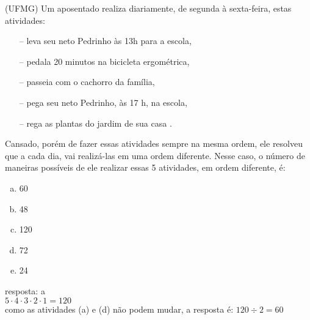 \begin{ex}
 (UFMG) Um aposentado realiza diariamente, de segunda à sexta-feira, estas atividades:
    \begin{itemize}
    \item [--] leva seu neto Pedrinho às 13h para a escola,
    \item [--] pedala 20 minutos na bicicleta ergométrica, 
    \item [--] passeia com o cachorro da família,
    \item [--] pega seu neto Pedrinho, às 17 h, na escola,
    \item[--] rega as plantas do jardim de sua casa .
    \end{itemize}
Cansado, porém de fazer essas atividades sempre na mesma ordem, ele resolveu que a cada dia, vai realizá-las em uma ordem diferente.
Nesse caso, o número de maneiras possíveis de ele realizar essas 5 atividades, em ordem diferente, é:
    \begin{enumerate}[(a)]
    \item 60
    \item 48
    \item 120
    \item 72
    \item 24
    \end{enumerate}
      \begin{sol}
        resposta: a \\
        $5\cdot4\cdot3\cdot2\cdot1=120$  \\
        como as atividades (a) e (d) não podem mudar, a resposta é: $120\div 2 = 60$
      \end{sol}
\end{ex}